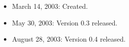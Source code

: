 \documentclass[11pt]{article}
\begin{document}
\begin{itemize}

  \item March 14, 2003: Created.
  \item May 30, 2003: Version 0.3 released.
  \item August 28, 2003: Version 0.4 released.

\end{itemize}




\end{document}
